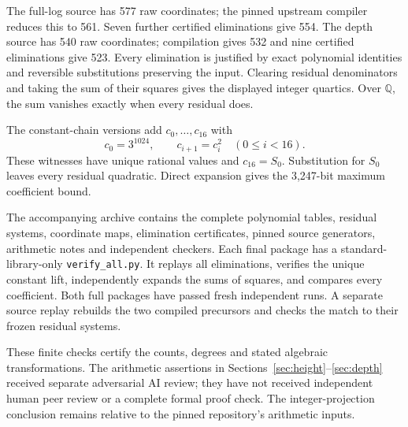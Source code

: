 \documentclass[11pt]{article}
\newcommand{\Q}{\mathbb Q}
\begin{document}
The full-log source has 577 raw coordinates; the pinned upstream compiler reduces this to 561. Seven further certified eliminations give 554. The depth source has 540 raw coordinates; compilation gives 532 and nine certified eliminations give 523. Every elimination is justified by exact polynomial identities and reversible substitutions preserving the input. Clearing residual denominators and taking the sum of their squares gives the displayed integer quartics. Over $\Q$, the sum vanishes exactly when every residual does.

The constant-chain versions add $c_0,\ldots,c_{16}$ with
\[
 c_0=3^{1024},\qquad c_{i+1}=c_i^2\quad(0\le i<16).
\]
These witnesses have unique rational values and $c_{16}=S_0$. Substitution for $S_0$ leaves every residual quadratic. Direct expansion gives the 3,247-bit maximum coefficient bound.

The accompanying archive contains the complete polynomial tables, residual systems, coordinate maps, elimination certificates, pinned source generators, arithmetic notes and independent checkers. Each final package has a standard-library-only \texttt{verify\_all.py}. It replays all eliminations, verifies the unique constant lift, independently expands the sums of squares, and compares every coefficient. Both full packages have passed fresh independent runs. A separate source replay rebuilds the two compiled precursors and checks the match to their frozen residual systems.

These finite checks certify the counts, degrees and stated algebraic transformations. The arithmetic assertions in Sections~\ref{sec:height}--\ref{sec:depth} received separate adversarial AI review; they have not received independent human peer review or a complete formal proof check. The integer-projection conclusion remains relative to the pinned repository's arithmetic inputs.
\end{document}
